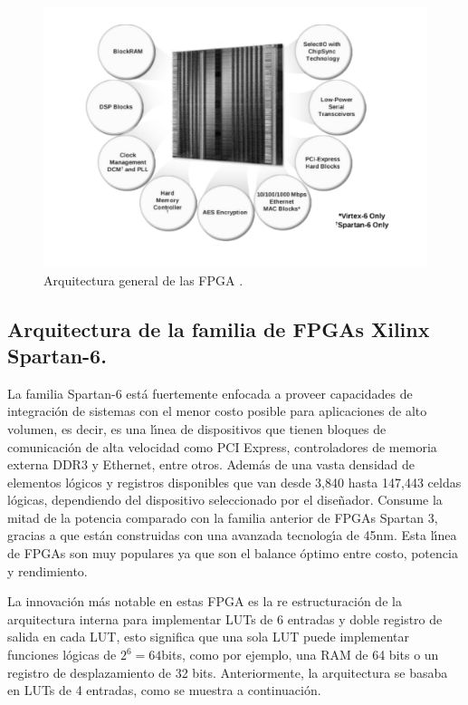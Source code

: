 \begin{figure}[H]
\begin{centering}
\includegraphics[scale=0.45]{img/fpga_arch}
\par\end{centering}
\caption{Arquitectura general de las FPGA \cite{x6vs}\label{fig:Arquitectura-general-de}.}
\end{figure}


\subsection{Arquitectura de la familia de FPGAs Xilinx Spartan-6.}

La familia Spartan-6 est\'{a} fuertemente enfocada a proveer capacidades
de integraci\'{o}n de sistemas con el menor costo posible para aplicaciones
de alto volumen, es decir, es una l\'{\i}nea de dispositivos que tienen
bloques de comunicaci\'{o}n de alta velocidad como PCI Express, controladores
de memoria externa DDR3 y Ethernet, entre otros. Adem\'{a}s de una
vasta densidad de elementos l\'{o}gicos y registros disponibles que
van desde 3,840 hasta 147,443 celdas l\'{o}gicas, dependiendo del
dispositivo seleccionado por el dise\~{n}ador. Consume la mitad de
la potencia comparado con la familia anterior de FPGAs Spartan 3,
gracias a que est\'{a}n construidas con una avanzada tecnolog\'{\i}a
de 45nm. Esta l\'{\i}nea de FPGAs son muy populares ya que son el
balance \'{o}ptimo entre costo, potencia y rendimiento\cite{Xil_DS160}.

La innovaci\'{o}n m\'{a}s notable en estas FPGA es la re estructuraci\'{o}n
de la arquitectura interna para implementar LUTs de 6 entradas y doble
registro de salida en cada LUT, esto significa que una sola LUT puede
implementar funciones l\'{o}gicas de $2^{6}=64$bits, como por ejemplo,
una RAM de 64 bits o un registro de desplazamiento de 32 bits. Anteriormente,
la arquitectura se basaba en LUTs de 4 entradas, como se muestra a
continuaci\'{o}n.

